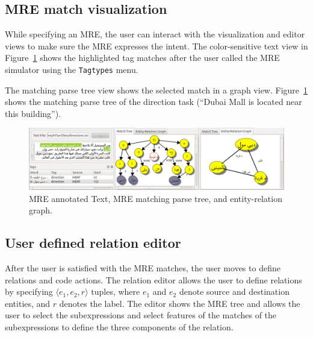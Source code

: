 \vspace{-1em}
\subsection{MRE match visualization}

While specifying an MRE, the user can interact with the visualization and editor views
to make sure the MRE expresses the intent. 
The color-sensitive text view in Figure~\ref{fig:treegraph} shows 
the highlighted tag matches after the user called the MRE simulator using 
the {\tt Tagtypes} menu. 

The matching parse tree view shows the selected match in a graph view.
Figure~\ref{fig:treegraph} shows the matching parse tree of the direction task 
(``Dubai Mall is located near this building''). 

\begin{figure}[tb]
  \centering
  \includegraphics[width=\textwidth]{figures/treegraph}
  \vspace{-2em}
  \caption{\label{fig:treegraph}MRE annotated Text, MRE matching parse tree, and entity-relation graph.}
\end{figure}


\subsection{User defined relation editor}

After the user is satisfied with the MRE matches, 
the user moves to define relations and code actions. 
The relation editor allows the user to define relations 
by specifying $\langle e_1,e_2,r\rangle$ tuples, 
where $e_1$ and $e_2$ denote source and destination entities, and $r$ denotes 
the label.
The editor shows the MRE tree and allows the user to select the subexpressions and select features 
of the matches of the subexpressions to define the three components of the relation. 

